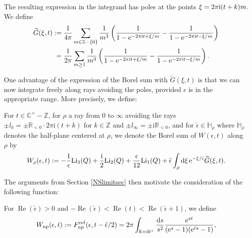 \documentclass[pdftex]{sigma}
\numberwithin{equation}{section}
\begin{document}
The resulting expression in the integrand has poles at the points $\xi=2\pi {\rm i}(t+k)m$. We define
\begin{align*}
 \widetilde{G}(\xi,t):={}& \frac{1}{4\pi}\sum_{m\in \mathbb{Z}-\{0\}}\frac{1}{m^3}\left(\frac{1}{1-{\rm e}^{-2\pi \mathrm{i} t+\xi/m}}-\frac{1}{1-{\rm e}^{-2\pi \mathrm{i} t-\xi/m}}\right)\\
 ={}& \frac{1}{2\pi}\sum_{m\geq 1}\frac{1}{m^3}\left(\frac{1}{1-{\rm e}^{-2\pi \mathrm{i} t+\xi/m}}-\frac{1}{1-{\rm e}^{-2\pi \mathrm{i} t-\xi/m}}\right).
 \end{align*}

One advantage of the expression of the Borel sum with $\widetilde{G}(\xi,t)$ is that we can now integrate freely along rays avoiding the poles, provided $\epsilon$ is in the appropriate range. More precisely, we define:

\begin{Definition}
For $t\in \mathbb{C}^{\times}-\mathbb{Z}$, for $\rho$ a ray from $0$ to $\infty$ avoiding the rays $\pm l_k=\pm \mathbb{R}_{<0}\cdot 2\pi \mathrm{i} (t+k)$ for $k\in \mathbb{Z}$ and $\pm l_{\infty}=\pm \mathrm{i} \mathbb{R}_{<0}$, and for $\check{\epsilon}\in \mathbb{H}_{\rho}$ where $\mathbb{H}_{\rho}$ denotes the half-plane centered at $\rho$, we denote the Borel sum of $W(\epsilon,t)$ along $\rho$ by
\begin{equation*}%
 W_{\rho}(\epsilon,t) := -\frac{1}{\epsilon} \mathrm{Li}_{3}(Q)+ \frac{\mathrm{i}}{2}\mathrm{Li}_{2}(Q)+\frac{\epsilon}{12}\mathrm{Li_1}(Q) + \check{\epsilon}\int_{\rho}\mathrm{d}\xi\, {\rm e}^{-\xi/\check{\epsilon}}\widetilde{G}(\xi,t).
\end{equation*}
\end{Definition}

The arguments from Section \ref{NSlimitsec} then motivate the consideration of the following function:

\begin{Definition} For $\operatorname{Re}(\check{\epsilon}) >0$ and $-\operatorname{Re}(\check{\epsilon}) < \operatorname{Re}(t) < \operatorname{Re} (\check{\epsilon}+1)$, we define
\begin{equation*}%
W_{\rm np}(\epsilon,t) :=F_{{\rm np}}^{\rm ref}(\epsilon,t-\check\epsilon/2)=2\pi \int_{\mathbb{R}+\mathrm i0^+} \frac{{\rm d}s}{s^2}\frac{{\rm e}^{s t}}{({\rm e}^s-1)({\rm e}^{\check{\epsilon}s}-1)},
\end{equation*}
\end{Definition}
\end{document}
